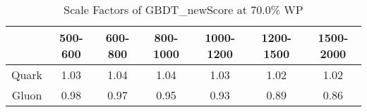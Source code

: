 \begin{table}
\centering
\caption{Scale Factors of GBDT_newScore at 70.0\% WP}
\label{tab:GBDT_newScore_0.7_Gluon}
\begin{tabular}{ccccccc}
\toprule
{} &  500-600 &  600-800 &  800-1000 &  1000-1200 &  1200-1500 &  1500-2000 \\
\midrule
Quark &     1.03 &     1.04 &      1.04 &       1.03 &       1.02 &       1.02 \\
Gluon &     0.98 &     0.97 &      0.95 &       0.93 &       0.89 &       0.86 \\
\bottomrule
\end{tabular}
\end{table}
